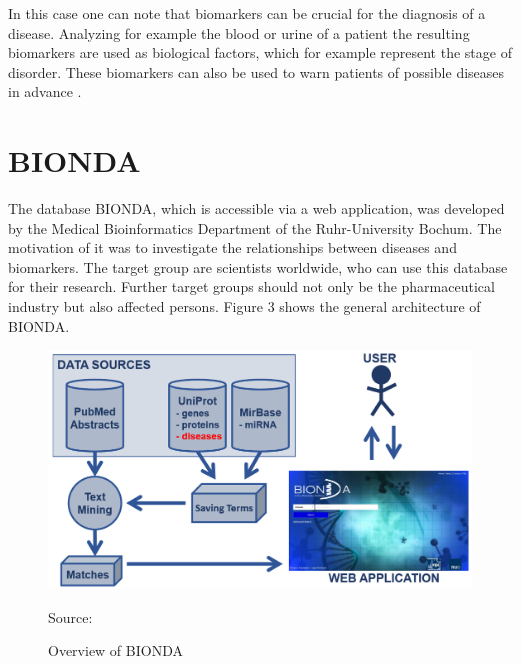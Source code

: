 In this case one can note that biomarkers can be crucial for the diagnosis of a disease. Analyzing for example the blood or urine of a patient the resulting biomarkers are used as biological factors, which for example represent the stage of disorder. These biomarkers can also be used to warn patients of possible diseases in advance \citep{mayeux_biomarkers:_2004}.


\section{BIONDA}
The database BIONDA, which is accessible via a web application, was developed by the Medical Bioinformatics Department of the Ruhr-University Bochum. The motivation of it was to investigate the relationships between diseases and biomarkers. The target group are scientists worldwide, who can use this database for their research. Further target groups should not only be the pharmaceutical industry but also affected persons. Figure 3 shows the general architecture of BIONDA.

\begin{figure}[H]
\centering
\includegraphics[scale=0.6]{bilder/BIONDA.png}
\caption{Overview of BIONDA}
Source: \citep{Bionda}
\label{fig:Overview_Bionda_Infra}
\end{figure}

